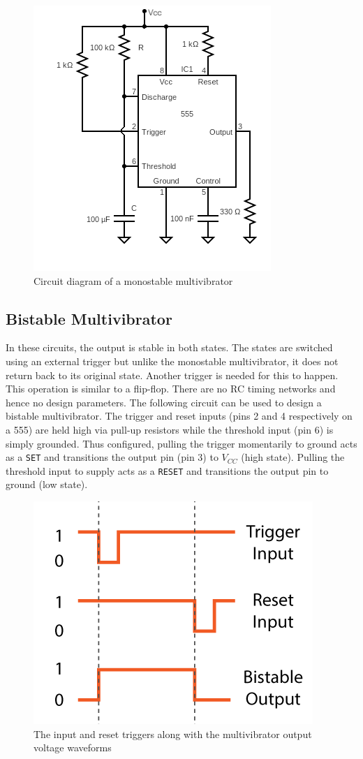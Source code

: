 \begin{figure}[H]
    \centering
    \includegraphics[width=0.65\columnwidth]{images/mono2.png}
    \caption{Circuit diagram of a monostable multivibrator}
    \label{mono2}
\end{figure}

\subsection{Bistable Multivibrator}
In these circuits, the output is stable in both states. The states are switched using an
external trigger but unlike the monostable multivibrator, it does not return back to its
original state. Another trigger is needed for this to happen. This operation is similar to a
flip-flop. There are no RC timing networks and hence no design parameters. The
following circuit can be used to design a bistable multivibrator. The trigger and reset
inputs (pins 2 and 4 respectively on a 555) are held high via pull-up resistors while the
threshold input (pin 6) is simply grounded. Thus configured, pulling the trigger
momentarily to ground acts as a \verb|SET| and transitions the output pin (pin 3) to $V_{CC}$ (high
state). Pulling the threshold input to supply acts as a \verb|RESET| and transitions the output pin
to ground (low state). 

\begin{figure}[H]
    \centering
    \includegraphics[width=0.5\columnwidth]{images/bis1.png}
    \caption{The input and reset triggers along with the multivibrator output voltage waveforms}
    \label{bis1}
\end{figure}

